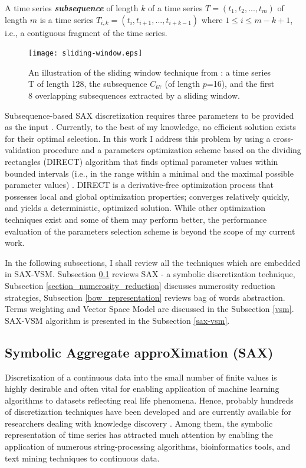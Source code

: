 A time series \textbf{\textit{subsequence}} of length $k$ of a time series $T = (t_{1}, t_{2},...,t_{m})$ of length $m$ is a time 
series $T_{i,k} = (t_{i},t_{i+1},...,t_{i+k-1})$  where $1 \leq i \leq m - k + 1$, i.e., a contiguous fragment of the time series.

\begin{figure}[t]
   \centering
   \texttt{[image: sliding-window.eps]}
   \caption{An illustration of the sliding window technique from \cite{citeulike:2821475}: a time series T of length 128, 
   the subsequence $C_{67}$ (of length $p$=16), and the first 8 overlapping subsequences extracted by a sliding window.}
   \label{fig:sliding_window}
\end{figure}

Subsequence-based SAX discretization requires three parameters to be provided as the input \cite{citeulike:2821475}. 
Currently, to the best of my knowledge, no efficient solution exists for their optimal selection. 
In this work I address this problem by using a cross-validation procedure and a parameters optimization scheme based on the dividing 
rectangles (DIRECT) algorithm that finds optimal parameter values within bounded intervals (i.e., in the range within a minimal and the maximal possible parameter values) \cite{citeulike:12563460}. 
DIRECT is a derivative-free optimization process that possesses local and global optimization properties; converges relatively quickly, and yields a deterministic, optimized solution. While other optimization techniques exist and some of them may perform better, the performance evaluation of the parameters selection scheme is beyond the scope of my current work.

In the following subsections, I shall review all the techniques which are embedded in SAX-VSM. 
Subsection \ref{section-sax} reviews SAX - a symbolic discretization technique, 
Subsection \ref{section_numerosity_reduction} discusses numerosity reduction strategies,
Subsection \ref{bow_representation} reviews bag of words abstraction.
Terms weighting and Vector Space Model are discussed in the Subsection \ref{vsm}. 
SAX-VSM algorithm is presented in the Subsection \ref{sax-vsm}. 


\subsection{Symbolic Aggregate approXimation (SAX)}\label{section-sax}
Discretization of a continuous data into the small number of finite values is highly desirable and often vital for enabling application of machine learning algorithms to datasets reflecting real life phenomena. Hence, probably hundreds of discretization techniques have been developed and are currently available for researchers dealing with knowledge discovery \cite{citeulike:12394286}. Among them, the symbolic representation of time series has attracted much attention by enabling the application of numerous string-processing algorithms, bioinformatics tools, and text mining techniques to continuous data.

